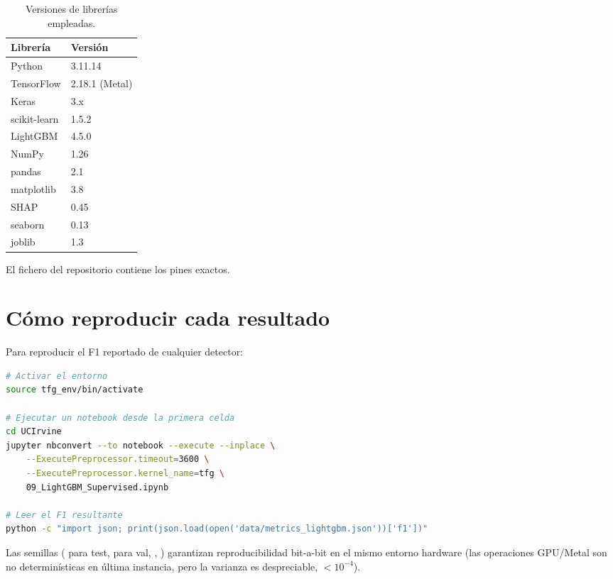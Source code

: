 \begin{table}[H]
\centering
\caption{Versiones de librerías empleadas.}
\label{tab:versions}
\small
\begin{tabularx}{0.6\textwidth}{l l}
\toprule
Librería & Versión \\
\midrule
Python              & 3.11.14 \\
TensorFlow          & 2.18.1 (Metal) \\
Keras               & 3.x \\
scikit-learn        & 1.5.2 \\
LightGBM            & 4.5.0 \\
NumPy               & 1.26 \\
pandas              & 2.1 \\
matplotlib          & 3.8 \\
SHAP                & 0.45 \\
seaborn             & 0.13 \\
joblib              & 1.3 \\
\bottomrule
\end{tabularx}
\end{table}

El fichero  del repositorio contiene los pines exactos.

\section{Cómo reproducir cada resultado}

Para reproducir el F1 reportado de cualquier detector:

\begin{lstlisting}[language=bash, basicstyle=\ttfamily\footnotesize]
# Activar el entorno
source tfg_env/bin/activate

# Ejecutar un notebook desde la primera celda
cd UCIrvine
jupyter nbconvert --to notebook --execute --inplace \
    --ExecutePreprocessor.timeout=3600 \
    --ExecutePreprocessor.kernel_name=tfg \
    09_LightGBM_Supervised.ipynb

# Leer el F1 resultante
python -c "import json; print(json.load(open('data/metrics_lightgbm.json'))['f1'])"
\end{lstlisting}

Las semillas (\code{seed=42} para test, \code{seed=777} para val, , ) garantizan reproducibilidad bit-a-bit en el mismo entorno hardware (las operaciones GPU/Metal son no determinísticas en última instancia, pero la varianza es despreciable, $< 10^{-4}$).

